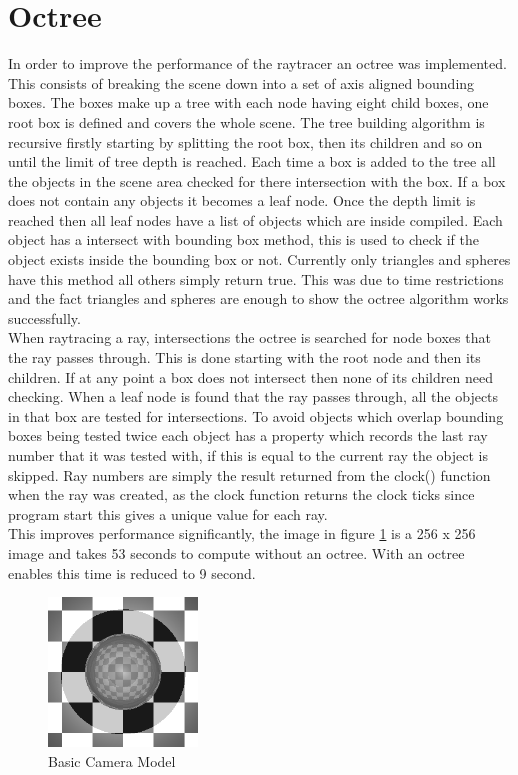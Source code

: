\documentclass{article}
\begin{document}
\section{Octree}

In order to improve the performance of the raytracer an octree was implemented.
This consists of breaking the scene down into a set of axis aligned bounding
boxes. The boxes make up a tree with each node having eight child
boxes, one root box is defined and covers the whole scene.
The tree building algorithm is recursive firstly starting by splitting
the root box, then its children and so on until the limit of tree depth is
reached. Each time a box is added to the tree all the objects in the scene area
checked for there intersection with the box. If a box does not contain any objects
it becomes a leaf node. Once the depth limit is reached then all leaf nodes have a list
of objects which are inside compiled. Each object has a intersect with bounding
box method, this is used to check if the object exists inside the bounding box or
not. Currently only triangles and spheres have this method all others simply return
true. This was due to time restrictions and the fact triangles and spheres are
enough to show the octree algorithm works successfully.\\

When raytracing a ray, intersections the octree is searched for node boxes that the ray passes through.
This is done starting with the root node and then its children. If at any point a
box does not intersect then none of its children need checking. When a
leaf node is found that the ray passes through, all the objects in that box
are tested for intersections. To avoid objects which overlap bounding boxes
being tested twice each object has a property which records the last ray number
that it was tested with, if this is equal to the current ray the object is
skipped. Ray numbers are simply the result returned from the clock() function
when the ray was created, as the clock function returns the clock ticks since
program start this gives a unique value for each ray.\\

This improves performance significantly, the image in figure \ref{fig:octree}
is a 256 x 256 image and takes 53 seconds to compute without an octree.
With an octree enables this time is reduced to 9 second.

\begin{figure}[H]
  \begin{center}
  \includegraphics[width=150px]{Images/octreeTest.png}
  \caption{Basic Camera Model}
  \label{fig:octree}
  \end{center}
\end{figure}



\end{document}
